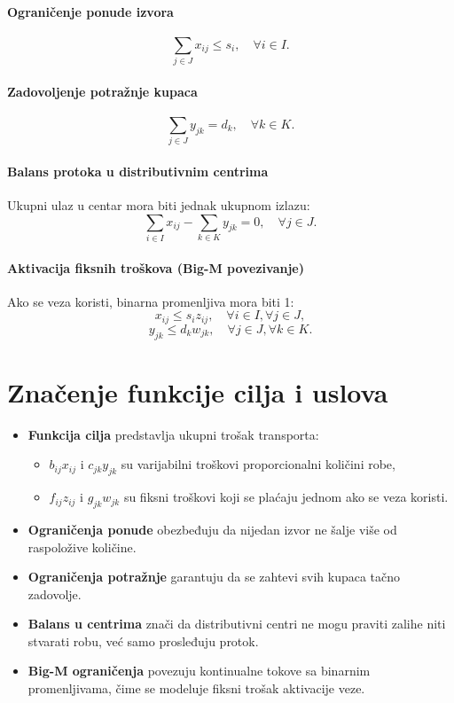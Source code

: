 \documentclass[12pt,a4paper]{article}
\begin{document}
\paragraph{Ograničenje ponude izvora}
\[
\sum_{j \in J} x_{ij} \le s_i, \quad \forall i \in I.
\]

\paragraph{Zadovoljenje potražnje kupaca}
\[
\sum_{j \in J} y_{jk} = d_k, \quad \forall k \in K.
\]

\paragraph{Balans protoka u distributivnim centrima}
Ukupni ulaz u centar mora biti jednak ukupnom izlazu:
\[
\sum_{i \in I} x_{ij} - \sum_{k \in K} y_{jk} = 0, \quad \forall j \in J.
\]

\paragraph{Aktivacija fiksnih troškova (Big-M povezivanje)}
Ako se veza koristi, binarna promenljiva mora biti 1:
\[
x_{ij} \le s_i z_{ij}, \quad \forall i \in I, \forall j \in J,
\]
\[
y_{jk} \le d_k w_{jk}, \quad \forall j \in J, \forall k \in K.
\]

\section{Značenje funkcije cilja i uslova}
\begin{itemize}
    \item \textbf{Funkcija cilja} predstavlja ukupni trošak transporta:
    \begin{itemize}
        \item $b_{ij}x_{ij}$ i $c_{jk}y_{jk}$ su varijabilni troškovi proporcionalni količini robe,
        \item $f_{ij}z_{ij}$ i $g_{jk}w_{jk}$ su fiksni troškovi koji se plaćaju jednom ako se veza koristi.
    \end{itemize}
    \item \textbf{Ograničenja ponude} obezbeđuju da nijedan izvor ne šalje više od raspoložive količine.
    \item \textbf{Ograničenja potražnje} garantuju da se zahtevi svih kupaca tačno zadovolje.
    \item \textbf{Balans u centrima} znači da distributivni centri ne mogu praviti zalihe niti stvarati robu, već samo prosleđuju protok.
    \item \textbf{Big-M ograničenja} povezuju kontinualne tokove sa binarnim promenljivama, čime se modeluje fiksni trošak aktivacije veze.
\end{itemize}
\end{document}
